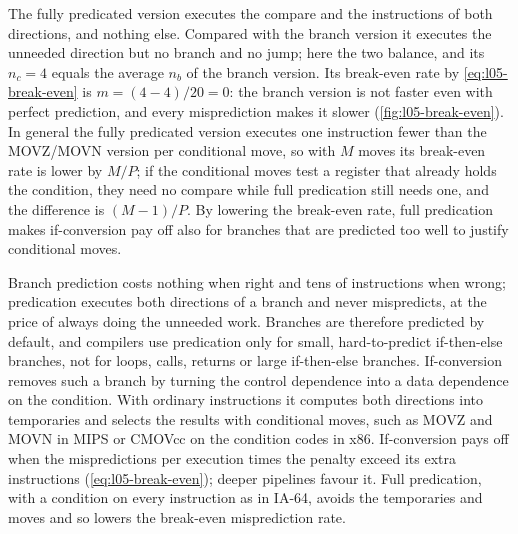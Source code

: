 \documentclass[../main.tex]{subfiles}
\begin{document}
The fully predicated version executes the compare and the instructions of
both directions, and nothing else.  Compared with the branch version it
executes the unneeded direction but no branch and no jump; here the two
balance, and its $n_c = 4$ equals the average $n_b$ of the branch version.
Its break-even rate by \cref{eq:l05-break-even} is $m = (4-4)/20 = 0$: the
branch version is not faster even with perfect prediction, and every
misprediction makes it slower (\cref{fig:l05-break-even}).  In general the
fully predicated version executes one instruction fewer than the MOVZ/MOVN
version per conditional move, so with $M$ moves its break-even rate is lower
by $M/P$; if the conditional moves test a register that already holds the
condition, they need no compare while full predication still needs one, and
the difference is $(M-1)/P$.  By lowering the break-even rate, full
predication makes if-conversion pay off also for branches that are predicted
too well to justify conditional moves.

\begin{keypoint}
  Branch prediction costs nothing when right and tens of instructions when
  wrong; predication executes both directions of a branch and never
  mispredicts, at the price of always doing the unneeded work.  Branches are
  therefore predicted by default, and compilers use predication only for
  small, hard-to-predict if-then-else branches, not for loops, calls, returns
  or large if-then-else branches.  If-conversion removes such a branch by
  turning the control dependence into a data dependence on the condition.
  With ordinary instructions it computes both directions into temporaries and
  selects the results with conditional moves, such as MOVZ and MOVN in MIPS or
  CMOVcc on the condition codes in x86.  If-conversion pays off when the
  mispredictions per execution times the penalty exceed its extra
  instructions (\cref{eq:l05-break-even}); deeper pipelines favour it.  Full
  predication, with a condition on every instruction as in IA-64, avoids the
  temporaries and moves and so lowers the break-even misprediction rate.
\end{keypoint}
\end{document}
